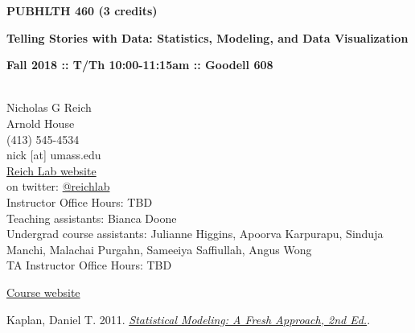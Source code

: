 \documentclass[10pt]{article}
\begin{document}
\centerline{\bf \large PUBHLTH 460 (3 credits)} 
\centerline{\bf \large Telling Stories with Data: Statistics, Modeling, and Data Visualization}
\centerline{\bf Fall 2018 :: T/Th 10:00-11:15am  :: Goodell 608 }

\vspace{.25in}
\\
\noindent Nicholas G Reich \\
 Arnold House \\
\noindent (413) 545-4534 \\
\noindent nick [at] umass.edu \\
\noindent \href{http://reichlab.github.io}{Reich Lab website}\\
\noindent on twitter: \href{https://twitter.com/reichlab}{@reichlab}\\
\noindent Instructor Office Hours: TBD \\
\noindent Teaching assistants: Bianca Doone\\
\noindent Undergrad course assistants: 
Julianne Higgins, 
Apoorva Karpurapu, 
Sinduja Manchi, 
Malachai Purgahn, 
Sameeiya Saffiullah,
Angus Wong\\
\noindent TA Instructor Office Hours:  TBD




\noindent \href{http://nickreich.github.io/data-stories/}{Course website}\\


\bigskip
{}


Kaplan, Daniel T. 2011. \emph{\href{http://www.mosaic-web.org/go/StatisticalModeling/}{Statistical Modeling: A Fresh Approach, 2nd Ed.}}. 
  


  
\end{document}
